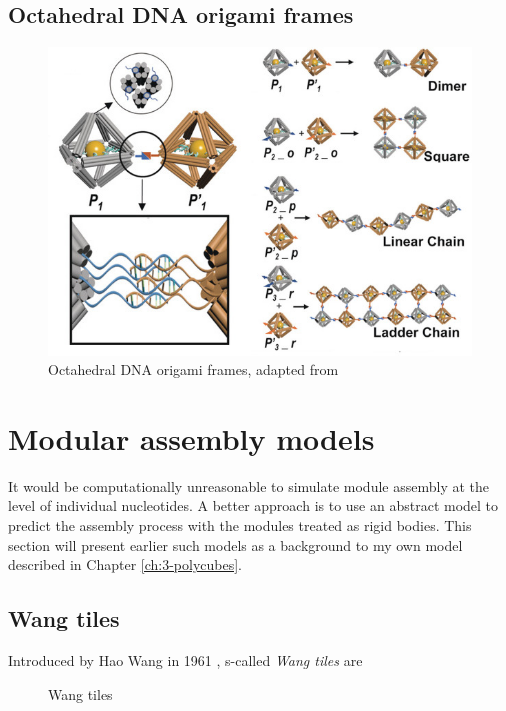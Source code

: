 \subsection{Octahedral DNA origami frames}

\begin{figure}[h]
  \centering\includegraphics[width=\textwidth]{figures/tian.jpg}
  \caption{Octahedral DNA origami frames, adapted from \cite{tian_octahedra2020}}
\end{figure}




\section{Modular assembly models}
It would be computationally unreasonable to simulate module assembly at the level of individual nucleotides. A better approach is to use an abstract model to predict the assembly process with the modules treated as rigid bodies. This section will present earlier such models as a background to my own model described in Chapter \ref{ch:3-polycubes}.

\subsection{Wang tiles}
Introduced by Hao Wang in 1961 \cite{wang1961proving}, s-called \emph{Wang tiles} are 

\begin{figure}[h]
  \centering
  \caption{Wang tiles}
\end{figure}

